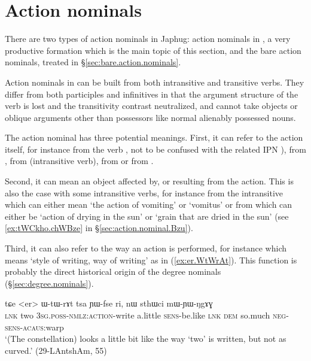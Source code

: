 \section{Action nominals} \label{sec:action.nominals}
There are two types of action nominals in Japhug: action nominals in , a very productive formation which is the main topic of this section, and the bare action nominals, treated in §\ref{sec:bare.action.nominals}.

Action nominals in  can be built from both intransitive and transitive verbs. They differ from both participles and infinitives in that the argument structure of the verb is lost and the transitivity contrast neutralized, and cannot take objects or oblique arguments other than possessors like normal alienably possessed nouns.


The action nominal has three potential meanings.  First, it can refer to the action itself, for instance  from the verb , not to be confused with the related IPN ),  from ,  from  (intransitive verb),  from  or  from .

Second, it can mean an object affected by, or resulting from the action. This is also the case with some intransitive verbs, for instance  from the intransitive  which can either mean `the action of vomiting' or `vomitus' or  from  which can either be `action of drying in the sun' or `grain that are dried in the sun' (see \ref{ex:tWCkho.chWBze} in §\ref{sec:action.nominal.Bzu}).

Third, it can also refer to the way an action is performed, for instance  which means `style of writing, way of writing' as in (\ref{ex:er.WtWrAt}). This function is probably the direct historical origin of the degree nominals (§\ref{sec:degree.nominals}).

\begin{exe}
\ex \label{ex:er.WtWrAt}
\gll  tɕe <er> ɯ-tɯ-rɤt tsa ɲɯ-fse ri, nɯ sthɯci mɯ-ɲɯ-ŋgɤɣ \\
\textsc{lnk} two \textsc{3sg}.\textsc{poss}-\textsc{nmlz}:\textsc{action}-write a.little \textsc{sens}-be.like \textsc{lnk} \textsc{dem} so.much \textsc{neg}-\textsc{sens}-\textsc{acaus}:warp \\
\glt `(The constellation) looks a little bit like the way `two' is written, but not as curved.' (29-LAntshAm, 55)
\end{exe} 
 
